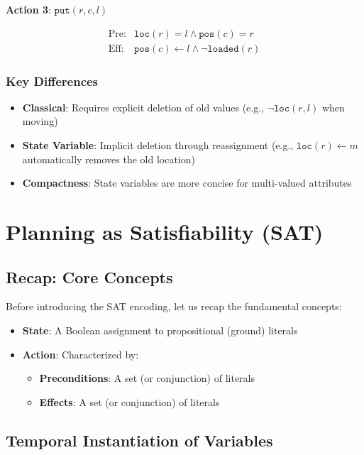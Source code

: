 \documentclass[11pt,a4paper]{article}
\theoremstyle{definition}
\theoremstyle{plain}
\theoremstyle{remark}
\begin{document}
\textbf{Action 3}: $\texttt{put}(r, c, l)$

\[
\begin{array}{ll}
\text{Pre:} & \texttt{loc}(r) = l \land \texttt{pos}(c) = r \\
\text{Eff:} & \texttt{pos}(c) \leftarrow l \land \neg \texttt{loaded}(r)
\end{array}
\]

\subsubsection{Key Differences}

\begin{itemize}
    \item \textbf{Classical}: Requires explicit deletion of old values (e.g., $\neg \texttt{loc}(r, l)$ when moving)
    \item \textbf{State Variable}: Implicit deletion through reassignment (e.g., $\texttt{loc}(r) \leftarrow m$ automatically removes the old location)
    \item \textbf{Compactness}: State variables are more concise for multi-valued attributes
\end{itemize}

\section{Planning as Satisfiability (SAT)}

\subsection{Recap: Core Concepts}

Before introducing the SAT encoding, let us recap the fundamental concepts:

\begin{itemize}
    \item \textbf{State}: A Boolean assignment to propositional (ground) literals
    \item \textbf{Action}: Characterized by:
    \begin{itemize}
        \item \textbf{Preconditions}: A set (or conjunction) of literals
        \item \textbf{Effects}: A set (or conjunction) of literals
    \end{itemize}
\end{itemize}

\subsection{Temporal Instantiation of Variables}
\end{document}
